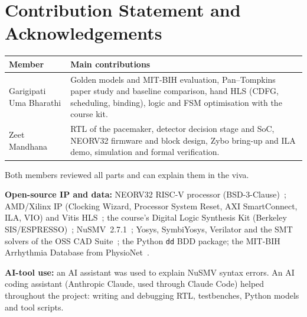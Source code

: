 \documentclass[11pt,a4paper]{article}
\newcommand{\studentA}{Garigipati Uma Bharathi}
\newcommand{\studentB}{Zeet Mandhana}
\begin{document}
\section*{Contribution Statement and Acknowledgements}
\label{sec:contrib}
\begin{table}[H]\centering\small
\begin{tabularx}{\linewidth}{@{}lX@{}}
\toprule
Member & Main contributions\\
\midrule
\studentA & Golden models and MIT-BIH evaluation, Pan--Tompkins paper study and baseline
comparison, hand HLS (CDFG, scheduling, binding), logic and FSM optimisation with the course kit.\\
\studentB & RTL of the pacemaker, detector decision stage and SoC, NEORV32 firmware and
block design, Zybo bring-up and ILA demo, simulation and formal verification.\\
\bottomrule
\end{tabularx}
\end{table}
Both members reviewed all parts and can explain them in the viva.

\textbf{Open-source IP and data:} NEORV32 RISC-V processor (BSD-3-Clause)~\cite{neorv32}; AMD/Xilinx
IP (Clocking Wizard, Processor System Reset, AXI SmartConnect, ILA, VIO) and Vitis HLS~\cite{ug1399};
the course's Digital Logic Synthesis Kit (Berkeley SIS/ESPRESSO)~\cite{vl401kit}; NuSMV~2.7.1~\cite{nusmv};
Yosys, SymbiYosys, Verilator and the SMT solvers of the OSS CAD Suite~\cite{yosys}; the Python
\texttt{dd} BDD package; the MIT-BIH Arrhythmia Database from PhysioNet~\cite{moody,goldberger}.

\textbf{AI-tool use:} an AI assistant was used to explain NuSMV syntax errors. An AI coding
assistant (Anthropic Claude, used through Claude Code) helped throughout the project: writing and
debugging RTL, testbenches, Python models and tool scripts.
\end{document}
